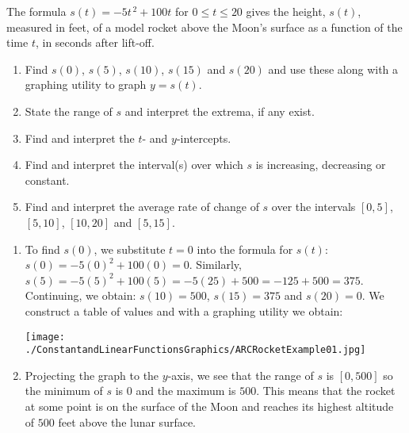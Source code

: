 \documentclass{ximera}
\begin{document}
\begin{example} \label{ARCRocketExample} The formula $s(t) = -5t^{\,2} + 100t$ for $0 \leq t \leq 20$ gives the height, $s(t)$, measured in feet, of a model rocket above the Moon's surface as a function of the time $t$, in seconds after lift-off.

\begin{enumerate}

\item Find $s(0)$, $s(5)$, $s(10)$, $s(15)$ and $s(20)$ and use these along with a graphing utility to graph $y = s(t)$.

\item State the range of $s$ and interpret the extrema, if any exist.

\item Find and interpret the $t$- and $y$-intercepts.  

\item Find and interpret the interval(s) over which $s$ is increasing, decreasing or constant.  

\item Find and interpret the average rate of change of $s$ over the intervals $[0,5]$, $[5,10]$, $[10, 20]$ and $[5, 15]$.


\end{enumerate}

\begin{explanation}

\begin{enumerate}

\item  To find $s(0)$, we substitute $t=0$ into the formula for $s(t)$:  $s(0) = -5(0)^2+100(0) = 0$.  Similarly,  $s(5) = -5(5)^2+100(5) = -5(25)+500 = -125+500 = 375$.  Continuing, we obtain: $s(10) = 500$, $s(15) = 375$ and $s(20) = 0$.  We construct a table of values and with a graphing utility we obtain:

\begin{center}
\texttt{[image: ./ConstantandLinearFunctionsGraphics/ARCRocketExample01.jpg]}

\end{center}

\item  Projecting the graph to the $y$-axis, we see that the range of $s$ is $[0, 500]$ so the minimum of $s$ is $0$ and the maximum is $500$.  This means that the rocket at some point is on the surface of the Moon and reaches its highest altitude of $500$ feet above the lunar surface.


\end{enumerate}
\end{explanation}
\end{example}
\end{document}
